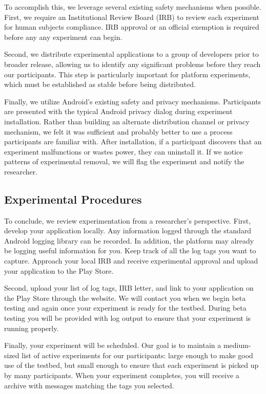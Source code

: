 To accomplish this, we leverage several existing safety mechanisms when
possible. First, we require an Institutional Review Board (IRB) to review
each \PhoneLab{} experiment for human subjects compliance. IRB approval or an
official exemption is required before any \PhoneLab{} any experiment can begin.

Second, we distribute experimental applications to a group of developers
prior to broader release, allowing us to identify any significant problems
before they reach our participants. This step is particularly important for
platform experiments, which must be established as stable before being
distributed.

Finally, we utilize Android's existing safety and privacy mechanisms.
Participants are presented with the typical Android privacy dialog during
experiment installation. Rather than building an alternate distribution
channel or privacy mechanism, we felt it was sufficient and probably better
to use a process participants are familiar with. After installation, if a
participant discovers that an experiment malfunctions or wastes power, they
can uninstall it. If we notice patterns of experimental removal, we will flag
the experiment and notify the researcher.

\subsection{Experimental Procedures}

To conclude, we review \PhoneLab{} experimentation from a researcher's
perspective. First, develop your application locally. Any information logged
through the standard Android logging library can be recorded. In addition,
the platform may already be logging useful information for you. Keep track of
all the log tags you want \PhoneLab{} to capture. Approach your local IRB and
receive experimental approval and upload your application to the Play Store.

Second, upload your list of log tags, IRB letter, and link to your
application on the Play Store through the \PhoneLab{} website. We will
contact you when we begin beta testing and again once your experiment is
ready for the testbed. During beta testing you will be provided with
\PhoneLab{} log output to ensure that your experiment is running properly.

Finally, your experiment will be scheduled. Our goal is to maintain a
medium-sized list of active experiments for our participants: large enough to
make good use of the testbed, but small enough to ensure that each experiment
is picked up by many participants. When your experiment completes, you will
receive a archive with messages matching the tags you selected.
